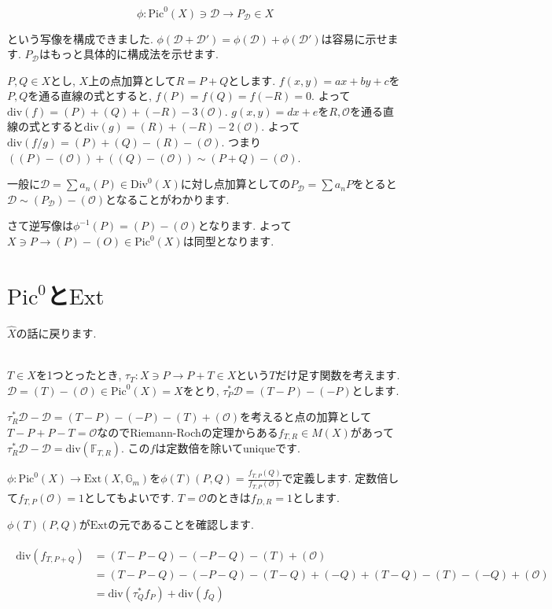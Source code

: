 \documentclass{jsarticle}
\def\Ext{\mathrm{Ext}}
\def\Pic{\mathrm{Pic}}
\def\Div{\mathrm{Div}}
\def\div{\mathrm{div}}
\theoremstyle{definition}
\numberwithin{theorem}{section}
\begin{document}
\begin{equation*}
\phi: \Pic^0(X) \ni \mathcal{D} \rightarrow P_\mathcal{D} \in X
\end{equation*}

という写像を構成できました. $\phi(\mathcal{D} + \mathcal{D}') = \phi(\mathcal{D}) + \phi(\mathcal{D}')$は容易に示せます. $P_\mathcal{D}$はもっと具体的に構成法を示せます.

$P, Q \in X$とし, $X$上の点加算として$R = P+Q$とします. $f(x, y) = ax+by+c$を$P, Q$を通る直線の式とすると, $f(P) = f(Q) = f(-R) = 0$. よって$\div(f) = (P) + (Q) + (-R) - 3(\mathcal{O})$. $g(x, y) = dx+e$を$R, \mathcal{O}$を通る直線の式とすると$\div(g) = (R) + (-R) - 2(\mathcal{O})$. よって$\div(f/g) = (P) + (Q) - (R) - (\mathcal{O})$. つまり$((P) - (\mathcal{O})) + ((Q) - (\mathcal{O})) \sim (P+Q) - (\mathcal{O})$.

一般に$\mathcal{D} = \sum a_n(P) \in \Div^0(X)$に対し点加算としての$P_\mathcal{D} = \sum a_n P$をとると$\mathcal{D} \sim (P_\mathcal{D}) - (\mathcal{O})$となることがわかります. 

さて逆写像は$\phi^{-1}(P) = (P) - (\mathcal{O})$となります. よって$X \ni P \rightarrow (P) - (O) \in \Pic^0(X)$は同型となります. 

\section{$\Pic^0$と$\Ext$}
$\hat{X}$の話に戻ります.

\hrulefill\\

$T \in X$を1つとったとき, $\tau_T : X \ni P \rightarrow P+T \in X$という$T$だけ足す関数を考えます. $\mathcal{D} = (T) - (\mathcal{O}) \in \Pic^0(X) = X$をとり, $\tau_P^*\mathcal{D} = (T-P) - (-P)$とします.

$\tau_R^*\mathcal{D} - \mathcal{D} = (T-P) - (-P) - (T) + (\mathcal{O})$を考えると点の加算として$T - P + P - T = \mathcal{O}$なのでRiemann-Rochの定理からある$f_{T, R} \in M(X)$があって$\tau_R^*\mathcal{D} - \mathcal{D} = \div(\mathbb{F}_{T, R})$.
この$f$は定数倍を除いてuniqueです.

$\phi: \Pic^0(X) \rightarrow \Ext(X, \mathbb{G}_m)$を$\displaystyle\phi(T)(P, Q) = \frac{f_{T, P}(Q)}{f_{T, P}(\mathcal{O})}$で定義します. 定数倍して$f_{T, P}(\mathcal{O}) = 1$としてもよいです. $T = \mathcal{O}$のときは$f_{D, R} = 1$とします.

$\phi(T)(P, Q)$が$\Ext$の元であることを確認します.

\begin{eqnarray*}
\begin{aligned}
\div(f_{T, P+Q}) &= (T-P-Q) - (-P-Q) - (T) + (\mathcal{O})\\
&= (T-P-Q) - (-P-Q) - (T-Q) + (-Q) + (T-Q) - (T) - (-Q) + (\mathcal{O})\\
&= \div(\tau_Q^*f_P) + \div(f_Q)
\end{aligned}
\end{eqnarray*}
\end{document}
